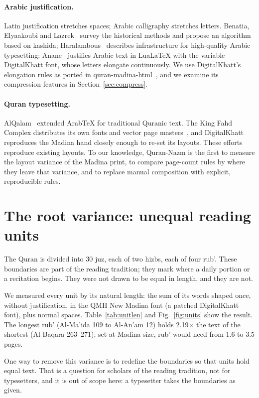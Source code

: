 \documentclass[sigconf,nonacm]{acmart}
\newcommand{\x}{\ensuremath{\times}}
\begin{document}
\paragraph{Arabic justification.} Latin justification stretches spaces; Arabic calligraphy stretches letters. Benatia, Elyaakoubi and Lazrek~\cite{benatia2006} survey the historical methods and propose an algorithm based on kashida; Haralambous~\cite{haralambous2006} describes infrastructure for high-quality Arabic typesetting; Anane~\cite{anane2021} justifies Arabic text in Lua\LaTeX{} with the variable DigitalKhatt font, whose letters elongate continuously. We use DigitalKhatt's elongation rules as ported in quran-madina-html~\cite{qmh}, and we examine its compression features in Section~\ref{sec:compress}.

\paragraph{Quran typesetting.} AlQalam~\cite{fahmy2006} extended ArabTeX for traditional Quranic text. The King Fahd Complex distributes its own fonts and vector page masters~\cite{kfgqpcdm}, and DigitalKhatt reproduces the Madina hand closely enough to re-set its layouts. These efforts reproduce existing layouts. To our knowledge, Quran-Nazm is the first to measure the layout variance of the Madina print, to compare page-count rules by where they leave that variance, and to replace manual composition with explicit, reproducible rules.

\section{The root variance: unequal reading units}\label{sec:units}
The Quran is divided into 30 juz, each of two hizbs, each of four rub'. These boundaries are part of the reading tradition; they mark where a daily portion or a recitation begins. They were not drawn to be equal in length, and they are not.

We measured every unit by its natural length: the sum of its words shaped once, without justification, in the QMH New Madina font (a patched DigitalKhatt font), plus normal spaces. Table~\ref{tab:unitlen} and Fig.~\ref{fig:units} show the result. The longest rub' (Al-Ma'ida 109 to Al-An'am 12) holds 2.19\x{} the text of the shortest (Al-Baqara 263--271); set at Madina size, rub' would need from 1.6 to 3.5 pages.

One way to remove this variance is to redefine the boundaries so that units hold equal text. That is a question for scholars of the reading tradition, not for typesetters, and it is out of scope here: a typesetter takes the boundaries as given.
\end{document}
